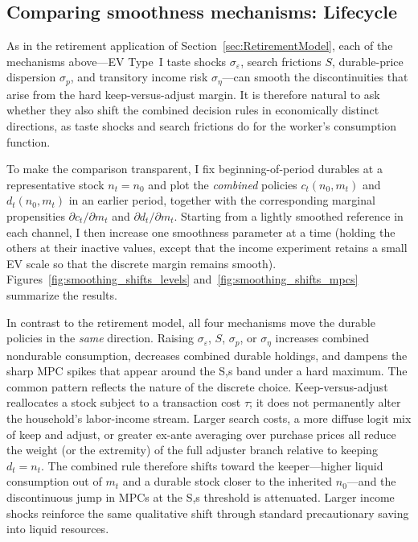 \subsection{Comparing smoothness mechanisms: Lifecycle}\label{subsec:ModelBasicSmoothingCompare}

As in the retirement application of Section~\ref{sec:RetirementModel}, each of the mechanisms above---EV Type~I taste shocks $\sigma_\varepsilon$, search frictions $S$, durable-price dispersion $\sigma_p$, and transitory income risk $\sigma_\eta$---can smooth the discontinuities that arise from the hard keep-versus-adjust margin. It is therefore natural to ask whether they also shift the combined decision rules in economically distinct directions, as taste shocks and search frictions do for the worker's consumption function.

To make the comparison transparent, I fix beginning-of-period durables at a representative stock $n_t=n_0$ and plot the \emph{combined} policies $c_t(n_0,m_t)$ and $d_t(n_0,m_t)$ in an earlier period, together with the corresponding marginal propensities $\partial c_t/\partial m_t$ and $\partial d_t/\partial m_t$. Starting from a lightly smoothed reference in each channel, I then increase one smoothness parameter at a time (holding the others at their inactive values, except that the income experiment retains a small EV scale so that the discrete margin remains smooth). Figures~\ref{fig:smoothing_shifts_levels} and~\ref{fig:smoothing_shifts_mpcs} summarize the results.

In contrast to the retirement model, all four mechanisms move the durable policies in the \emph{same} direction. Raising $\sigma_\varepsilon$, $S$, $\sigma_p$, or $\sigma_\eta$ increases combined nondurable consumption, decreases combined durable holdings, and dampens the sharp MPC spikes that appear around the S,s band under a hard maximum. The common pattern reflects the nature of the discrete choice. Keep-versus-adjust reallocates a stock subject to a transaction cost $\tau$; it does not permanently alter the household's labor-income stream. Larger search costs, a more diffuse logit mix of keep and adjust, or greater ex-ante averaging over purchase prices all reduce the weight (or the extremity) of the full adjuster branch relative to keeping $d_t=n_t$. The combined rule therefore shifts toward the keeper---higher liquid consumption out of $m_t$ and a durable stock closer to the inherited $n_0$---and the discontinuous jump in MPCs at the S,s threshold is attenuated. Larger income shocks reinforce the same qualitative shift through standard precautionary saving into liquid resources.

